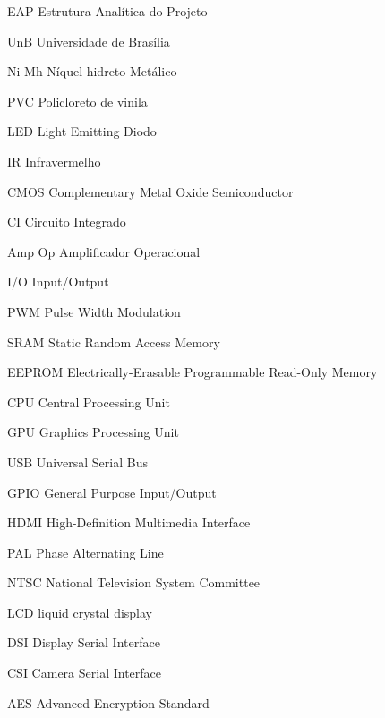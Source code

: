 \begin{siglas}
\item [EAP ] Estrutura Analítica do Projeto
\item [UnB ] Universidade de Brasília
\item [Ni-Mh ] Níquel-hidreto Metálico
\item [PVC ] Policloreto de vinila 
\item [LED ] Light Emitting Diodo
\item [IR ] Infravermelho
\item [CMOS ] Complementary Metal Oxide Semiconductor
\item [CI ] Circuito Integrado
\item [Amp Op ] Amplificador Operacional
\item [I/O ] Input/Output
\item [PWM ] Pulse Width Modulation
\item [SRAM ] Static Random Access Memory
\item [EEPROM ] Electrically-Erasable Programmable Read-Only Memory
\item [CPU ] Central Processing Unit
\item [GPU ] Graphics Processing Unit
\item [USB ] Universal Serial Bus
\item [GPIO ] General Purpose Input/Output
\item [HDMI ] High-Definition Multimedia Interface
\item [PAL ] Phase Alternating Line
\item [NTSC ] National Television System Committee
\item [LCD ] liquid crystal display
\item [DSI ] Display Serial Interface
\item [CSI ] Camera Serial Interface
\item [AES ] Advanced Encryption Standard
\end{siglas}
